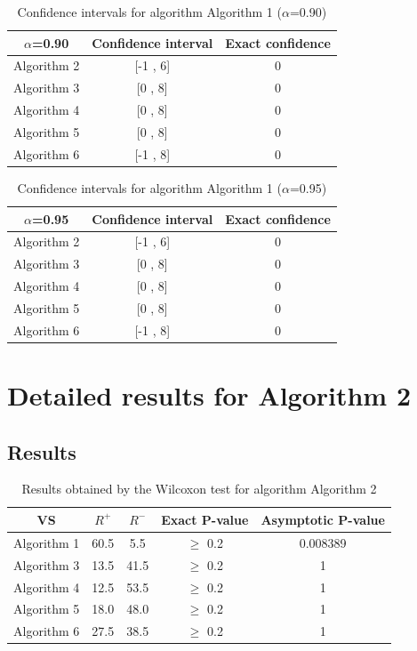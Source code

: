 \documentclass[a4paper,10pt]{article}
\begin{document}
\begin{table}[!htp]
\centering\small
\begin{tabular}{
|c|c|c|}
\hline
 $\alpha$=0.90 & Confidence interval & Exact confidence \\ \hline 
Algorithm 2 & [-1 , 6] & 0\\ \hline 
Algorithm 3 & [0 , 8] & 0\\ \hline 
Algorithm 4 & [0 , 8] & 0\\ \hline 
Algorithm 5 & [0 , 8] & 0\\ \hline 
Algorithm 6 & [-1 , 8] & 0\\ \hline 

\end{tabular}
\caption{Confidence intervals for algorithm Algorithm 1 ($\alpha$=0.90)}
\end{table}
\begin{table}[!htp]
\centering\small
\begin{tabular}{
|c|c|c|}
\hline
 $\alpha$=0.95 & Confidence interval & Exact confidence \\ \hline 
Algorithm 2 & [-1 , 6] & 0\\ \hline 
Algorithm 3 & [0 , 8] & 0\\ \hline 
Algorithm 4 & [0 , 8] & 0\\ \hline 
Algorithm 5 & [0 , 8] & 0\\ \hline 
Algorithm 6 & [-1 , 8] & 0\\ \hline 

\end{tabular}
\caption{Confidence intervals for algorithm Algorithm 1 ($\alpha$=0.95)}
\end{table}

 \clearpage 


\section{Detailed results for Algorithm 2}


\subsection{Results}

\begin{table}[!htp]
\centering\small
\begin{tabular}{
|c|c|c|c|c|}
\hline
 VS & $R^{+}$ & $R^{-}$ & Exact P-value & Asymptotic P-value \\ \hline 
Algorithm 1 & 60.5 & 5.5 & $\geq$ 0.2 & 0.008389\\ \hline 
Algorithm 3 & 13.5 & 41.5 & $\geq$ 0.2 & 1\\ \hline 
Algorithm 4 & 12.5 & 53.5 & $\geq$ 0.2 & 1\\ \hline 
Algorithm 5 & 18.0 & 48.0 & $\geq$ 0.2 & 1\\ \hline 
Algorithm 6 & 27.5 & 38.5 & $\geq$ 0.2 & 1\\ \hline 

\end{tabular}
\caption{Results obtained by the Wilcoxon test for algorithm Algorithm 2}
\end{table}
\end{document}
